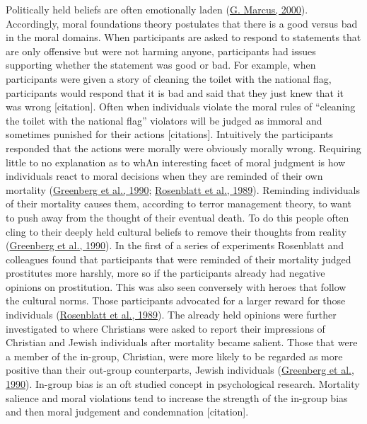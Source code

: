 \documentclass[
  donotrepeattitle,doc, 12pt, a4paper,floatsintext]{apa7}
\begin{document}
Politically held beliefs are often emotionally laden (\protect\hyperlink{ref-marcus2000}{G. Marcus, 2000}). Accordingly, moral foundations theory postulates that there is a good versus bad in the moral domains. When participants are asked to respond to statements that are only offensive but were not harming anyone, participants had issues supporting whether the statement was good or bad. For example, when participants were given a story of cleaning the toilet with the national flag, participants would respond that it is bad and said that they just knew that it was wrong {[}citation{]}. Often when individuals violate the moral rules of ``cleaning the toilet with the national flag'' violators will be judged as immoral and sometimes punished for their actions {[}citations{]}. Intuitively the participants responded that the actions were morally were obviously morally wrong. Requiring little to no explanation as to whAn interesting facet of moral judgment is how individuals react to moral decisions when they are reminded of their own mortality (\protect\hyperlink{ref-greenberg1990}{Greenberg et al., 1990}; \protect\hyperlink{ref-rosenblatt1989}{Rosenblatt et al., 1989}). Reminding individuals of their mortality causes them, according to terror management theory, to want to push away from the thought of their eventual death. To do this people often cling to their deeply held cultural beliefs to remove their thoughts from reality (\protect\hyperlink{ref-greenberg1990}{Greenberg et al., 1990}). In the first of a series of experiments Rosenblatt and colleagues found that participants that were reminded of their mortality judged prostitutes more harshly, more so if the participants already had negative opinions on prostitution. This was also seen conversely with heroes that follow the cultural norms. Those participants advocated for a larger reward for those individuals (\protect\hyperlink{ref-rosenblatt1989}{Rosenblatt et al., 1989}). The already held opinions were further investigated to where Christians were asked to report their impressions of Christian and Jewish individuals after mortality became salient. Those that were a member of the in-group, Christian, were more likely to be regarded as more positive than their out-group counterparts, Jewish individuals (\protect\hyperlink{ref-greenberg1990}{Greenberg et al., 1990}). In-group bias is an oft studied concept in psychological research. Mortality salience and moral violations tend to increase the strength of the in-group bias and then moral judgement and condemnation {[}citation{]}.
\end{document}
